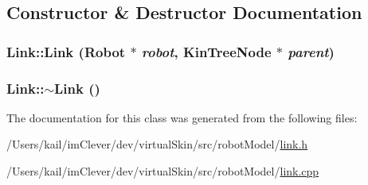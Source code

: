 \subsection{Constructor \& Destructor Documentation}
\hypertarget{class_robot_model_1_1_link_adf46ff7e38787594ac9941a478083f21}{
\subsubsection[{Link}]{\setlength{\rightskip}{0pt plus 5cm}Link::Link ({\bf Robot} $\ast$ {\em robot}, \/  {\bf KinTreeNode} $\ast$ {\em parent})}}
\label{class_robot_model_1_1_link_adf46ff7e38787594ac9941a478083f21}
\hypertarget{class_robot_model_1_1_link_a666e442abb3122fe5eb1705f1b2d650d}{
\subsubsection[{$\sim$Link}]{\setlength{\rightskip}{0pt plus 5cm}Link::$\sim$Link ()}}
\label{class_robot_model_1_1_link_a666e442abb3122fe5eb1705f1b2d650d}


The documentation for this class was generated from the following files:\begin{DoxyCompactItemize}
\item 
/Users/kail/imClever/dev/virtualSkin/src/robotModel/\hyperlink{link_8h}{link.h}\item 
/Users/kail/imClever/dev/virtualSkin/src/robotModel/\hyperlink{link_8cpp}{link.cpp}\end{DoxyCompactItemize}

